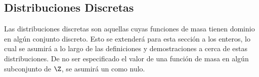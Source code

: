 \subsection{Distribuciones Discretas}
Las distribuciones discretas son aquellas cuyas funciones de masa tienen
dominio en algún conjunto discreto. Esto se extenderá para esta
sección a los enteros, lo cual se asumirá a lo largo de
las definiciones y demostraciones a cerca de estas distribuciones.
De no ser especificado el valor de una función de masa en algún
subconjunto de $\Z$, se asumirá un como nulo.






\clearpage